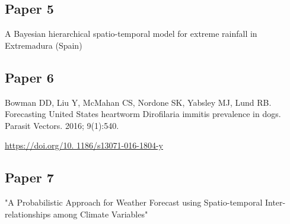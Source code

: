 \subsection{Paper 5}

A Bayesian hierarchical spatio-temporal model for extreme rainfall in Extremadura (Spain)





\subsection{Paper 6}


Bowman DD, Liu Y, McMahan CS, Nordone SK, Yabsley MJ, Lund RB. Forecasting United States heartworm Dirofilaria immitis prevalence in dogs. Parasit Vectors. 2016; 9(1):540. 

\url{https://doi.org/10. 1186/s13071-016-1804-y}


\subsection{Paper 7}

"A Probabilistic Approach for Weather Forecast using Spatio-temporal Inter-relationships among Climate Variables"
